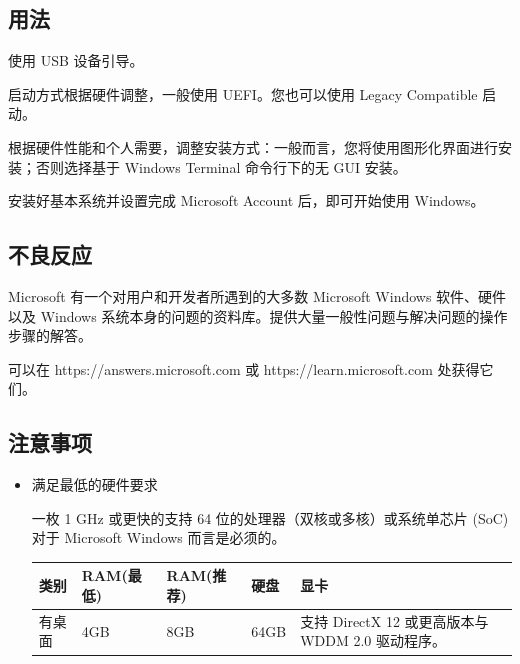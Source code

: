 \documentclass{article}
\begin{document}
\begin{multicols*}{3}
	\begin{tcolorbox}
	\section*{用法}
	\end{tcolorbox}

	使用 USB 设备引导。

	启动方式根据硬件调整，一般使用 UEFI。您也可以使用 Legacy Compatible 启动。

	根据硬件性能和个人需要，调整安装方式：一般而言，您将使用图形化界面进行安装；否则选择基于 Windows Terminal 命令行下的无 GUI 安装。

	安装好基本系统并设置完成 Microsoft Account 后，即可开始使用 Windows。

	\medskip

	\begin{tcolorbox}
	\section*{不良反应}
	\end{tcolorbox}

	Microsoft 有一个对用户和开发者所遇到的大多数 Microsoft Windows 软件、硬件以及 Windows 系统本身的问题的资料库。提供大量一般性问题与解决问题的操作步骤的解答。

	可以在 https://answers.microsoft.com 或 https://learn.microsoft.com 处获得它们。

	\medskip


	\begin{tcolorbox}
	\section*{注意事项}
	\end{tcolorbox}
	\begin{itemize}[leftmargin=*]

		\item 满足最低的硬件要求

		一枚 1 GHz 或更快的支持 64 位的处理器（双核或多核）或系统单芯片 (SoC) 对于 Microsoft Windows 而言是必须的。

		{\small\begin{tabularx}{\linewidth}{|X|X|X|X|}
			\hline
			类别 & RAM\newline (最低) & RAM\newline (推荐) & 硬盘 & 显卡 \\
			\hline
			有桌面 & 4GB & 8GB & 64GB & 支持 DirectX 12 或更高版本与 WDDM 2.0 驱动程序。 \\
		\end{tabularx}}


\end{itemize}
\end{multicols*}
\end{document}
